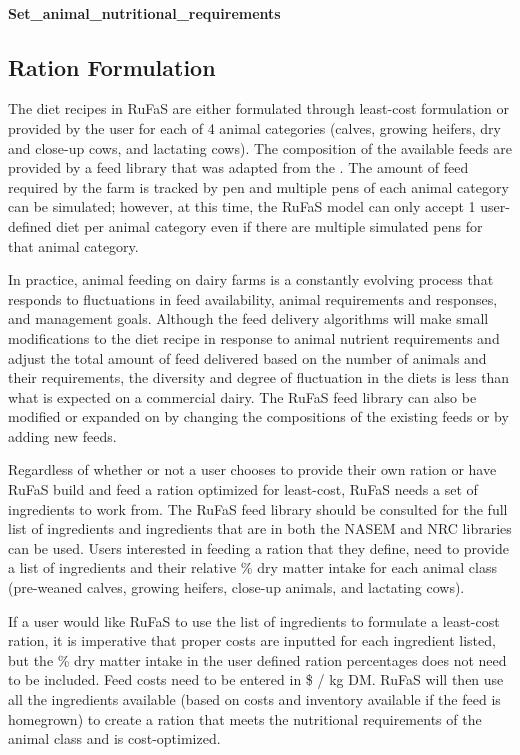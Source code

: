 \documentclass{article}
\begin{document}
\begin{refsection}
    \paragraph{Set\_animal\_nutritional\_requirements}


\subsection{Ration Formulation}
The diet recipes in RuFaS are either formulated through least-cost formulation \parencite{Li2022} or provided by the user for each of 4 animal categories (calves, growing heifers, dry and close-up cows, and lactating cows). The composition of the available feeds are provided by a feed library that was adapted from the \cite{nrc2021}. The amount of feed required by the farm is tracked by pen and multiple pens of each animal category can be simulated; however, at this time, the RuFaS model can only accept 1 user-defined diet per animal category even if there are multiple simulated pens for that animal category.  

In practice, animal feeding on dairy farms is a constantly evolving process that responds to fluctuations in feed availability, animal requirements and responses, and management goals. Although the feed delivery algorithms will make small modifications to the diet recipe in response to animal nutrient requirements and adjust the total amount of feed delivered based on the number of animals and their requirements, the diversity and degree of fluctuation in the diets is less than what is expected on a commercial dairy. The RuFaS feed library can also be modified or expanded on by changing the compositions of the existing feeds or by adding new feeds. 

Regardless of whether or not a user chooses to provide their own ration or have RuFaS build and feed a ration optimized for least-cost, RuFaS needs a set of ingredients to work from. The RuFaS feed library should be consulted for the full list of ingredients and ingredients that are in both the NASEM and NRC libraries can be used. Users interested in feeding a ration that they define, need to provide a list of ingredients and their relative \% dry matter intake for each animal class (pre-weaned calves, growing heifers, close-up animals, and lactating cows). 

\vspace{0.2cm}

If a user would like RuFaS to use the list of ingredients to formulate a least-cost ration, it is imperative that proper costs are inputted for each ingredient listed, but the \% dry matter intake in the user defined ration percentages does not need to be included. Feed costs need to be entered in \$ / kg DM. RuFaS will then use all the ingredients available (based on costs and inventory available if the feed is homegrown) to create a ration that meets the nutritional requirements of the animal class and is cost-optimized. 



\end{refsection}
\end{document}

